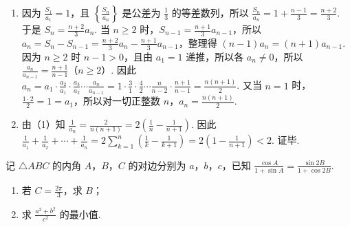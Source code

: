 \begin{solution}
\begin{enumerate}
\item 因为
\(\frac{S_1}{a_1}=1\)，且 \(\left\{\frac{S_n}{a_n}\right\}\) 是公差为 \(\frac13\) 的等差数列，所以
\(\frac{S_n}{a_n}=1+\frac{n-1}{3}=\frac{n+2}{3}\).
于是
\(S_n=\frac{n+2}{3}a_n\).
当 \(n\ge 2\) 时，\(S_{n-1}=\frac{n+1}{3}a_{n-1}\)，所以
\(a_n=S_n-S_{n-1}=\frac{n+2}{3}a_n-\frac{n+1}{3}a_{n-1}\)，整理得
\((n-1)a_n=(n+1)a_{n-1}\).
因为 \(n\ge 2\) 时 \(n-1>0\)，且由 \(a_1=1\) 递推，所以各 \(a_n\ne 0\)，所以
\(\frac{a_n}{a_{n-1}}=\frac{n+1}{n-1}\)（\(n\ge 2\)）.
因此
\(a_n=a_1\cdot \frac{a_2}{a_1}\cdot \frac{a_3}{a_2}\cdots \frac{a_n}{a_{n-1}}=1\cdot \frac31\cdot \frac42\cdots \frac{n}{n-2}\cdot \frac{n+1}{n-1}=\frac{n(n+1)}{2}\).
又当 \(n=1\) 时，\(\frac{1\cdot 2}{2}=1=a_1\)，所以对一切正整数 \(n\)，\(a_n=\frac{n(n+1)}{2}\).
\item 由（1）知
\(\frac1{a_n}=\frac{2}{n(n+1)}=2\left(\frac1n-\frac1{n+1}\right)\).
因此
\(\frac1{a_1}+\frac1{a_2}+\cdots+\frac1{a_n}=2\sum_{k=1}^n\left(\frac1k-\frac1{k+1}\right)=2\left(1-\frac1{n+1}\right)<2\).
证毕.
\end{enumerate}
\end{solution}

\begin{problem}
记 \(\triangle ABC\) 的内角 \(A\)，\(B\)，\(C\) 的对边分别为 \(a\)，\(b\)，\(c\)，已知 \(\frac{\cos A}{1+\sin A}=\frac{\sin 2B}{1+\cos 2B}\).

\begin{enumerate}
\item 若 \(C=\frac{2\pi}{3}\)，求 \(B\)；

\item 求 \(\frac{a^2+b^2}{c^2}\) 的最小值.
\end{enumerate}
\end{problem}

